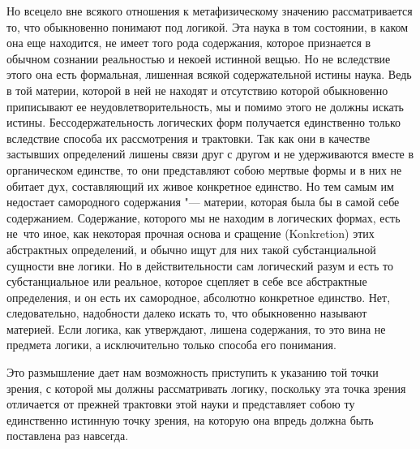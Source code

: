 Но всецело вне всякого отношения к метафизическому значению рассматривается
то, что обыкновенно понимают под логикой. Эта наука в том состоянии, в
каком она еще находится, не имеет того рода содержания, которое признается
в обычном сознании реальностью и некоей истинной вещью. Но не вследствие
этого она есть формальная, лишенная всякой содержательной истины наука.
Ведь в той материи, которой в ней не находят и отсутствию которой
обыкновенно приписывают ее неудовлетворительность, мы и помимо этого не
должны искать истины. Бессодержательность логических форм получается
единственно только вследствие способа их рассмотрения и трактовки. Так как
они в качестве застывших определений лишены связи друг с другом и не
удерживаются вместе в органическом единстве, то они представляют собою
мертвые формы и в них не обитает дух, составляющий их живое конкретное
единство. Но тем самым им недостает самородного содержания "--- материи,
которая была бы в самой себе содержанием. Содержание, которого мы не
находим в логических формах, есть не~что иное, как некоторая прочная основа
и сращение (Konkretion) этих абстрактных определений, и обычно ищут для них
такой субстанциальной сущности вне логики. Но в действительности сам
логический разум и есть то субстанциальное или реальное, которое сцепляет в
себе все абстрактные определения, и он есть их самородное, абсолютно
конкретное единство. Нет, следовательно, надобности далеко искать то, что
обыкновенно называют материей. Если логика, как утверждают, лишена
содержания, то это вина не предмета логики, а исключительно только способа
его понимания.

Это размышление дает нам возможность приступить к указанию той точки зрения,
с которой мы должны рассматривать логику, поскольку эта точка зрения
отличается от прежней трактовки этой науки и представляет собою ту
единственно истинную точку зрения, на которую она впредь должна быть
поставлена раз навсегда.

